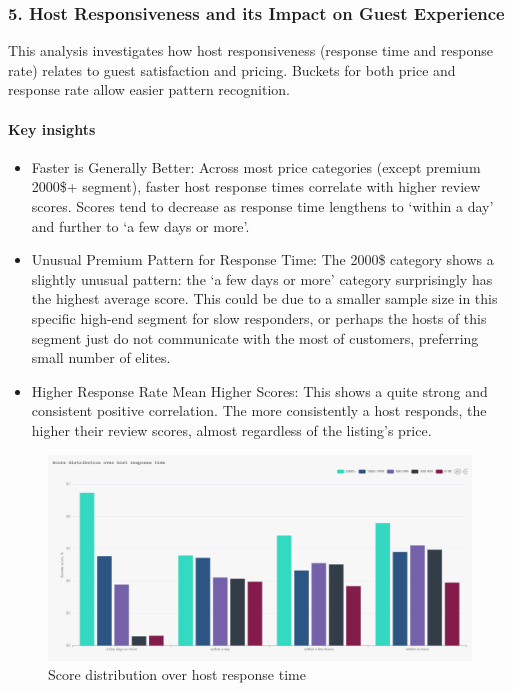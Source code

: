 \subsubsection*{5. Host Responsiveness and its Impact on Guest Experience }

This analysis investigates how host responsiveness (response time and response rate) relates to guest satisfaction and pricing. Buckets for both price and response rate allow easier pattern recognition.

\vspace{0.5em}
\paragraph{Key insights}
\begin{itemize}
    \item Faster is Generally Better: Across most price categories (except premium 2000\$+ segment), faster host response times correlate with higher review scores. Scores tend to decrease as response time lengthens to `within a day' and further to `a few days or more'.
    \item Unusual Premium Pattern for Response Time: The 2000\$ category shows a slightly unusual pattern: the `a few days or more' category surprisingly has the highest average score. This could be due to a smaller sample size in this specific high-end segment for slow responders, or perhaps the hosts of this segment just do not communicate with the most of customers, preferring small number of elites.
    \item Higher Response Rate Mean Higher Scores: This shows a quite strong and consistent positive correlation. The more consistently a host responds, the higher their review scores, almost regardless of the listing's price.
\end{itemize}

\vspace{1em}
\begin{figure}[H]
    \centering
    \includegraphics[width=1\textwidth]{images/q5_1.jpg}
    \caption{Score distribution over host response time}\label{fig:figureq9}
\end{figure}

